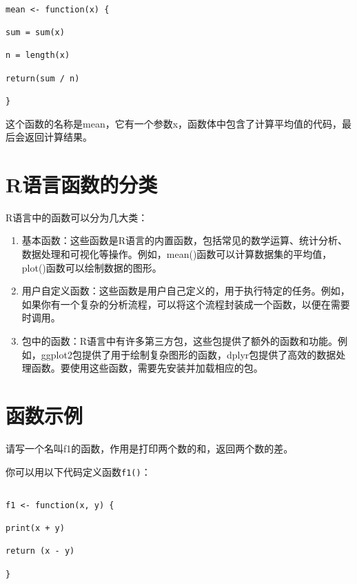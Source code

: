 \documentclass[
  letterpaper,
  DIV=11,
  numbers=noendperiod]{scrreprt}
\begin{document}
\begin{verbatim}

mean <- function(x) {

sum = sum(x)

n = length(x)

return(sum / n)

}
\end{verbatim}

这个函数的名称是mean，它有一个参数x，函数体中包含了计算平均值的代码，最后会返回计算结果。

\hypertarget{rux8bedux8a00ux51fdux6570ux7684ux5206ux7c7b}{%
\section{R语言函数的分类}\label{rux8bedux8a00ux51fdux6570ux7684ux5206ux7c7b}}

R语言中的函数可以分为几大类：

\begin{enumerate}
\def\labelenumi{\arabic{enumi}.}
\item
  基本函数：这些函数是R语言的内置函数，包括常见的数学运算、统计分析、数据处理和可视化等操作。例如，mean()函数可以计算数据集的平均值，plot()函数可以绘制数据的图形。
\item
  用户自定义函数：这些函数是用户自己定义的，用于执行特定的任务。例如，如果你有一个复杂的分析流程，可以将这个流程封装成一个函数，以便在需要时调用。
\item
  包中的函数：R语言中有许多第三方包，这些包提供了额外的函数和功能。例如，ggplot2包提供了用于绘制复杂图形的函数，dplyr包提供了高效的数据处理函数。要使用这些函数，需要先安装并加载相应的包。
\end{enumerate}

\hypertarget{ux51fdux6570ux793aux4f8b}{%
\section{函数示例}\label{ux51fdux6570ux793aux4f8b}}

请写一个名叫f1的函数，作用是打印两个数的和，返回两个数的差。

你可以用以下代码定义函数\texttt{f1()}：

\begin{verbatim}

f1 <- function(x, y) {

print(x + y)

return (x - y)

}
\end{verbatim}
\end{document}
